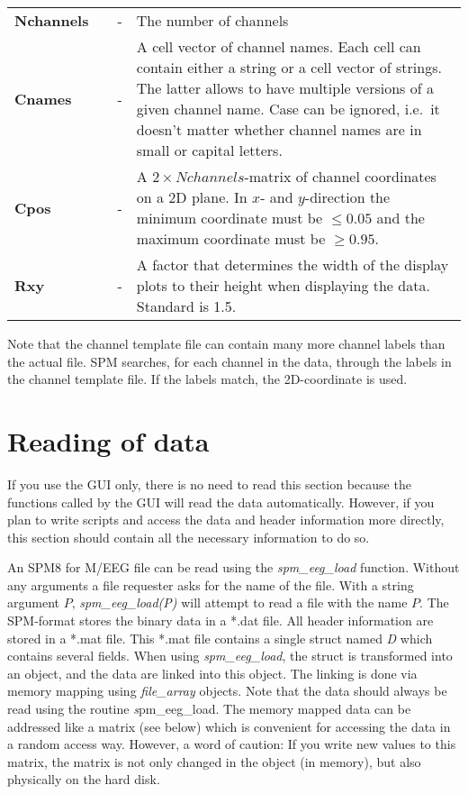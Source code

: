 \begin{tabular}{llcp{9cm}}
{\bf Nchannels} & &  - & The number of channels\\
{\bf Cnames}&  & - & A cell vector of channel names. Each cell can
contain either a string or a cell vector of strings. The latter allows
to have multiple versions of a given channel name. Case can be
ignored, i.e.~it doesn't matter whether channel names are in small or
capital letters.\\
{\bf Cpos} & & - & A $2 \times Nchannels$-matrix of channel
coordinates on a 2D plane. In $x$- and $y$-direction the minimum
coordinate must be $\leq 0.05$ and the maximum coordinate
must be $\geq 0.95$. \\ 
{\bf Rxy} & & - & A factor that determines the width of the display
plots to their height when displaying the data. Standard is 1.5. \\
\end{tabular}

Note that the channel template file can contain many more channel
labels than the actual file. SPM searches, for each channel in the
data, through the labels in the channel template file. If the labels
match, the 2D-coordinate is used. 


\section{Reading of data}
\label{sec:load}
If you use the GUI only, there is no need to read this
section because the functions called by the GUI will read the data
automatically. However, if you plan to write scripts and access the
data and header information more directly, this section should contain
all the necessary information to do so. 

An SPM8 for M/EEG file can be read using the \textit{spm\_eeg\_load}
function. Without any arguments a file requester asks for the name of
the file. With a string argument $P$, \textit{spm\_eeg\_load(P)} will
attempt to read a file with the name $P$. The SPM-format stores the
binary data in a *.dat file. All header information are stored in a
*.mat file. This *.mat file contains a single struct named {\textit D}
which contains several fields. When using \textit{spm\_eeg\_load}, the
struct is transformed into an object, and the data are linked into this
object. The linking is done via memory mapping using \textit{file\_array}
objects. Note that the data should always be read using the routine 
{\textit spm\_eeg\_load}. The memory mapped data can be
addressed like a matrix (see below) which is convenient for accessing
the data in a random access way. However, a word of caution: If you
write new values to this matrix, the matrix is not only changed
in the object (in memory), but also physically on the hard
disk.  


